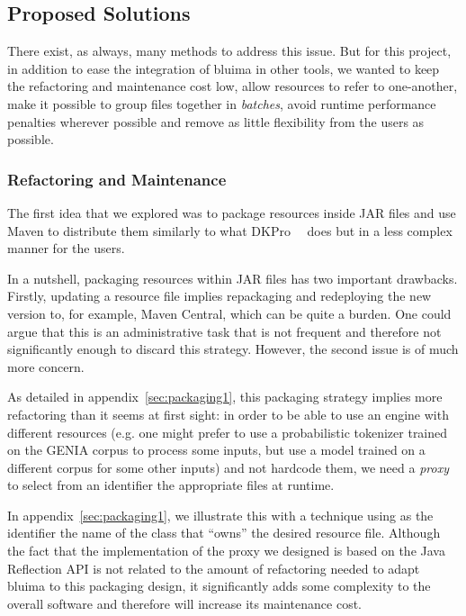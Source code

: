\documentclass{article}
\newcommand{\JAR}{JAR\xspace}
\begin{document}
\subsection{Proposed Solutions}

There exist, as always, many methods to address this issue. But for this project, in addition to
ease the integration of bluima in other tools, we wanted to keep the refactoring and maintenance
cost low, allow resources to refer to one-another, make it possible to group files together in
\emph{batches}, avoid runtime performance penalties wherever possible and remove as little
flexibility from the users as possible.

\subsubsection{Refactoring and Maintenance}

The first idea that we explored was to package resources inside \JAR files and use Maven to
distribute them similarly to what DKPro~\cite{dkpro}~\cite{dkpro_2014} does but in a less complex
manner for the users.

In a nutshell, packaging resources within \JAR files has two important drawbacks. Firstly, updating
a resource file implies repackaging and redeploying the new version to, for example, Maven Central,
which can be quite a burden. One could argue that this is an administrative task that is not
frequent and therefore not significantly enough to discard this strategy. However, the second issue
is of much more concern.

As detailed in appendix~\ref{sec:packaging1}, this packaging strategy implies more refactoring than
it seems at first sight: in order to be able to use an engine with different resources (e.g. one
might prefer to use a probabilistic tokenizer trained on the GENIA corpus to process some inputs,
but use a model trained on a different corpus for some other inputs) and not hardcode them, we need
a \emph{proxy} to select from an identifier the appropriate files at runtime.

In appendix~\ref{sec:packaging1}, we illustrate this with a technique using as the identifier the
name of the class that ``owns'' the desired resource file. Although the fact that the implementation
of the proxy we designed is based on the Java Reflection API is not related to the amount of
refactoring needed to adapt bluima to this packaging design, it significantly adds some complexity
to the overall software and therefore will increase its maintenance cost.
\end{document}
